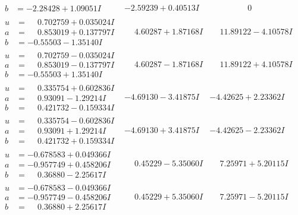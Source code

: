 \documentclass[1p]{elsarticle_modified}
\theoremstyle{definition}
\begin{document}
$$\begin{array}{c|c|c}
\begin{aligned}
b &= -2.28428 + 1.09051 I\end{aligned}
 & -2.59239 + 0.40513 I & \phantom{-0.000000 } 0 \\ \hline\begin{aligned}
u &= \phantom{-}0.702759 + 0.035024 I \\
a &= \phantom{-}0.853019 + 0.137797 I \\
b &= -0.55503 - 1.35140 I\end{aligned}
 & \phantom{-}4.60287 + 1.87168 I & \phantom{-}11.89122 - 4.10578 I \\ \hline\begin{aligned}
u &= \phantom{-}0.702759 - 0.035024 I \\
a &= \phantom{-}0.853019 - 0.137797 I \\
b &= -0.55503 + 1.35140 I\end{aligned}
 & \phantom{-}4.60287 - 1.87168 I & \phantom{-}11.89122 + 4.10578 I \\ \hline\begin{aligned}
u &= \phantom{-}0.335754 + 0.602836 I \\
a &= \phantom{-}0.93091 - 1.29214 I \\
b &= \phantom{-}0.421732 - 0.159334 I\end{aligned}
 & -4.69130 - 3.41875 I & -4.42625 + 2.23362 I \\ \hline\begin{aligned}
u &= \phantom{-}0.335754 - 0.602836 I \\
a &= \phantom{-}0.93091 + 1.29214 I \\
b &= \phantom{-}0.421732 + 0.159334 I\end{aligned}
 & -4.69130 + 3.41875 I & -4.42625 - 2.23362 I \\ \hline\begin{aligned}
u &= -0.678583 + 0.049366 I \\
a &= -0.957749 + 0.458206 I \\
b &= \phantom{-}0.36880 - 2.25617 I\end{aligned}
 & \phantom{-}0.45229 - 5.35060 I & \phantom{-}7.25971 + 5.20115 I \\ \hline\begin{aligned}
u &= -0.678583 - 0.049366 I \\
a &= -0.957749 - 0.458206 I \\
b &= \phantom{-}0.36880 + 2.25617 I\end{aligned}
 & \phantom{-}0.45229 + 5.35060 I & \phantom{-}7.25971 - 5.20115 I \\ \hline\begin{aligned}

\end{aligned}
\end{array}$$
\end{document}

